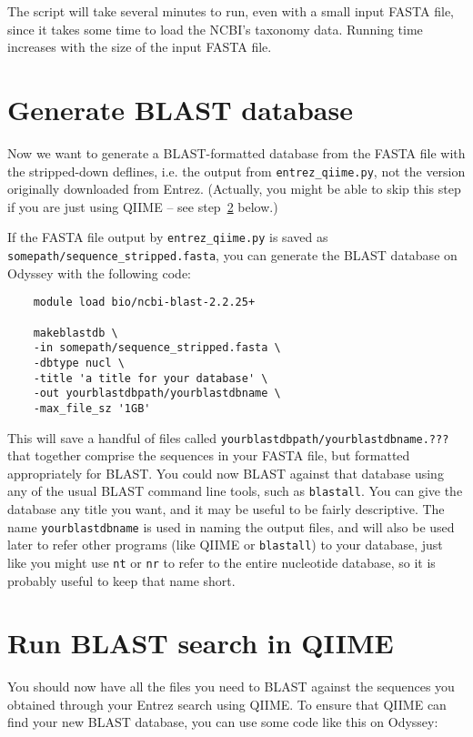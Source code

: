 \documentclass[11pt]{amsart}
\begin{document}
The script will take several minutes to run, even with a small input FASTA file, since it takes some time to load the NCBI's taxonomy data. Running time increases with the size of the input FASTA file.

\section{Generate BLAST database}
\label{section:blast}

Now we want to generate a BLAST-formatted database from the FASTA file with the stripped-down \mbox{deflines}, i.e. the output from \verb|entrez_qiime.py|, not the version originally downloaded from Entrez. (Actually, you might be able to skip this step if you are just using QIIME -- see step~\ref{section:qiime} below.)

If the FASTA file output by \verb|entrez_qiime.py| is saved as \verb|somepath/sequence_stripped.fasta|, you can generate the BLAST database on Odyssey with the following code:

\begin{verbatim}
    module load bio/ncbi-blast-2.2.25+

    makeblastdb \
    -in somepath/sequence_stripped.fasta \
    -dbtype nucl \
    -title 'a title for your database' \
    -out yourblastdbpath/yourblastdbname \
    -max_file_sz '1GB'
\end{verbatim}

This will save a handful of files called \verb|yourblastdbpath/yourblastdbname.???| that together comprise the sequences in your FASTA file, but formatted appropriately for BLAST. You could now BLAST against that database using any of the usual BLAST command line tools, such as \verb|blastall|. You can give the database any title you want, and it may be useful to be fairly descriptive. The name \verb|yourblastdbname| is used in naming the output files, and will also be used later to refer other programs (like QIIME or \verb|blastall|) to your database, just like you might use \verb|nt| or \verb|nr| to refer to the entire nucleotide database, so it is probably useful to keep that name short.

\section{Run BLAST search in QIIME}
\label{section:qiime}

You should now have all the files you need to BLAST against the sequences you obtained through your Entrez search using QIIME. To ensure that QIIME can find your new BLAST database, you can use some code like this on Odyssey:
\end{document}
